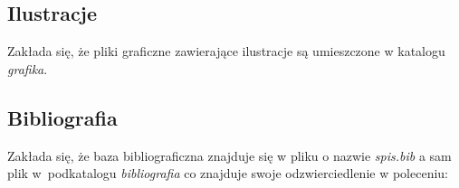 \subsection{Ilustracje}
Zakłada się, że pliki graficzne zawierające ilustracje są umieszczone w katalogu \textit{grafika}.

\subsection{Bibliografia}
Zakłada się, że baza bibliograficzna znajduje się w  pliku o nazwie \textit{spis.bib}  a sam plik w~podkatalogu \textit{bibliografia} co znajduje swoje odzwierciedlenie w poleceniu:

{\footnotesize \begin{verbatim}

\end{verbatim}
}

